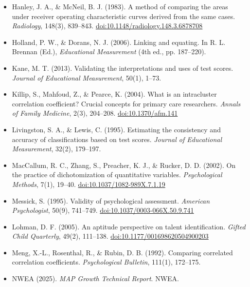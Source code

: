 \begin{itemize}[leftmargin=1.2em,itemsep=0.25em,label={}]
\item Hanley, J. A., \& McNeil, B. J. (1983). A method of comparing the areas
under receiver operating characteristic curves derived from the same cases.
\textit{Radiology}, 148(3), 839--843.
\href{https://doi.org/10.1148/radiology.148.3.6878708}{doi:10.1148/radiology.148.3.6878708}

\item Holland, P. W., \& Dorans, N. J. (2006). Linking and equating. In R. L.
Brennan (Ed.), \textit{Educational Measurement} (4th ed., pp. 187--220).

\item Kane, M. T. (2013). Validating the interpretations and uses of test
scores. \textit{Journal of Educational Measurement}, 50(1), 1--73.

\item Killip, S., Mahfoud, Z., \& Pearce, K. (2004). What is an
intracluster correlation coefficient? Crucial concepts for primary care
researchers. \textit{Annals of Family Medicine}, 2(3), 204--208.
\href{https://doi.org/10.1370/afm.141}{doi:10.1370/afm.141}

\item Livingston, S. A., \& Lewis, C. (1995). Estimating the consistency and
accuracy of classifications based on test scores.
\textit{Journal of Educational Measurement}, 32(2), 179--197.

\item MacCallum, R. C., Zhang, S., Preacher, K. J., \& Rucker, D. D. (2002).
On the practice of dichotomization of quantitative variables.
\textit{Psychological Methods}, 7(1), 19--40.
\href{https://doi.org/10.1037/1082-989X.7.1.19}{doi:10.1037/1082-989X.7.1.19}

\item Messick, S. (1995). Validity of psychological assessment.
\textit{American Psychologist}, 50(9), 741--749.
\href{https://doi.org/10.1037/0003-066X.50.9.741}{doi:10.1037/0003-066X.50.9.741}

\item Lohman, D. F. (2005). An aptitude perspective on talent identification.
\textit{Gifted Child Quarterly}, 49(2), 111--138.
\href{https://doi.org/10.1177/001698620504900203}{doi:10.1177/001698620504900203}

\item Meng, X.-L., Rosenthal, R., \& Rubin, D. B. (1992). Comparing correlated
correlation coefficients. \textit{Psychological Bulletin}, 111(1), 172--175.

\item NWEA (2025). \textit{MAP Growth Technical Report}. NWEA.


\end{itemize}
